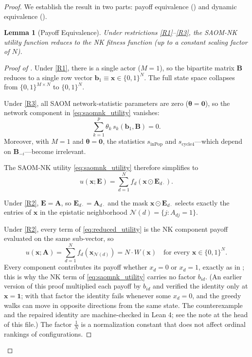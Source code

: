 \documentclass[12pt]{article}
\newtheorem{lemma}{Lemma}
\newcommand{\bx}{\mathbf{x}}
\newcommand{\bb}{\mathbf{b}}
\newcommand{\bB}{\mathbf{B}}
\newcommand{\bA}{\mathbf{A}}
\newcommand{\bE}{\mathbf{E}}
\newcommand{\btheta}{\boldsymbol{\theta}}
\begin{document}
\begin{proof}
We establish the result in two parts: payoff equivalence
() and dynamic equivalence
().

\begin{lemma}[Payoff Equivalence]
\label{lem:payoff_equiv}
Under restrictions \ref{R1}--\ref{R3}, the SAOM-NK utility function reduces to
the NK fitness function (up to a constant scaling factor of $N$).
\end{lemma}

\begin{proof}[Proof of ]
Under \ref{R1}, there is a single actor ($M=1$), so the bipartite matrix
$\bB$ reduces to a single row vector $\bb_1 \equiv \bx \in \{0,1\}^N$. The
full state space collapses from $\{0,1\}^{M \times N}$ to $\{0,1\}^N$.

Under \ref{R3}, all SAOM network-statistic parameters are zero
($\btheta = \mathbf{0}$), so the network component in
\eqref{eq:saomnk_utility} vanishes:
\begin{equation*}
  \sum_{k=1}^{p} \theta_k \, s_k(\bb_1, \bB) = 0.
\end{equation*}
Moreover, with $M = 1$ and $\btheta = \mathbf{0}$, the statistics
$s_{\mathrm{inPop}}$ and $s_{\mathrm{cycle4}}$---which depend on
$\bB_{-i}$---become irrelevant.

The SAOM-NK utility \eqref{eq:saomnk_utility} therefore simplifies to
\begin{equation}
\label{eq:reduced_utility}
  u(\bx; \bE) = \sum_{d=1}^{N} f_d\!\left(\bx \odot \bE_{d\cdot}\right).
\end{equation}

Under \ref{R2}, $\bE = \bA$, so $\bE_{d\cdot} = \bA_{d\cdot}$ and the
mask $\bx \odot \bE_{d\cdot}$ selects exactly the entries of $\bx$ in the
epistatic neighborhood $\mathcal{N}(d) = \{j : A_{dj} = 1\}$.

Under \ref{R2}, every term of \eqref{eq:reduced_utility} is the NK component
payoff evaluated on the same sub-vector, so
\begin{equation}
\label{eq:payoff_equiv}
  u(\bx; \bA) = \sum_{d=1}^{N} f_d(\bx_{\mathcal{N}(d)}) = N \cdot W(\bx)
  \quad\text{for every } \bx \in \{0,1\}^N .
\end{equation}
Every component contributes its payoff whether $x_d = 0$ or $x_d = 1$, exactly as
in ; this is why the NK term of \eqref{eq:saomnk_utility} carries
no factor $b_{id}$. (An earlier version of this proof multiplied each payoff by
$b_{id}$ and verified the identity only at $\bx = \mathbf{1}$; with that factor
the identity fails whenever some $x_d = 0$, and the greedy walks can move in
opposite directions from the same state. The counterexample and the repaired
identity are machine-checked in Lean 4; see the note at the head of this file.)
The factor $\frac{1}{N}$ is a normalization constant that does not affect
ordinal rankings of configurations.


\end{proof}
\end{proof}
\end{document}
